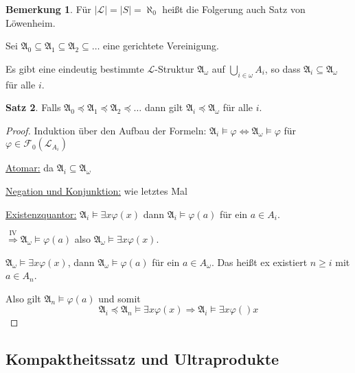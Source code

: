 \documentclass[12pt,parskip=full]{scrartcl}
\newcommand{\abs}[1]{{\left| #1 \right|}}
\newcommand{\heading}{\underline}
\theoremstyle{definition}
\newtheorem{theorem}{Satz}[section]
\newtheorem{remark}[theorem]{Bemerkung}
\begin{document}
	\begin{remark}
		Für $\abs{\mathcal{L}} = \abs{S} = \aleph_0$ heißt die Folgerung auch Satz von Löwenheim.
	\end{remark}

	Sei $\mathfrak{A}_0 \subseteq \mathfrak{A}_1 \subseteq \mathfrak{A}_2 \subseteq \dots$ eine gerichtete Vereinigung.
	
	Es gibt eine eindeutig bestimmte $\mathcal{L}$-Struktur $\mathfrak{A}_\omega$ auf $\bigcup_{i \in \omega} A_i$, so dass $\mathfrak{A}_i \subseteq \mathfrak{A}_\omega$ für alle $i$.
	
	\begin{theorem}
		Falls $\mathfrak{A}_0 \preccurlyeq \mathfrak{A}_1 \preccurlyeq \mathfrak{A}_2 \preccurlyeq \dots$ dann gilt $\mathfrak{A}_i \preccurlyeq \mathfrak{A}_\omega$ für alle $i$.
	\end{theorem}

	\begin{proof}
		Induktion über den Aufbau der Formeln: $\mathfrak{A}_i \models \varphi \Leftrightarrow \mathfrak{A}_\omega \models \varphi$ für $\varphi \in \mathcal{F}_0(\mathcal{L}_{A_i})$
		
		\heading{Atomar:} da $\mathfrak{A}_i \subseteq \mathfrak{A}_\omega$
		
		\heading{Negation und Konjunktion:} wie letztes Mal
		
		\heading{Existenzquantor:} $\mathfrak{A}_i \models \exists x \varphi(x)$ dann $\mathfrak{A}_i \models \varphi(a)$ für ein $a \in A_i$.
		
		$\overset{\text{IV}}{\Rightarrow} \mathfrak{A}_\omega \models \varphi(a)$ also $\mathfrak{A}_\omega \models \exists x \varphi(x)$.
		
		$\mathfrak{A}_\omega \models \exists x \varphi(x)$, dann $\mathfrak{A}_\omega \models \varphi(a)$ für ein $a \in A_\omega$. Das heißt ex existiert $n \geq i$ mit $a \in A_n$.
		
		Also gilt $\mathfrak{A}_n \models \varphi(a)$ und somit
		\begin{equation*}
			\mathfrak{A}_i \preccurlyeq \mathfrak{A}_n \models \exists x \varphi(x) \Rightarrow \mathfrak{A}_i \models \exists x \varphi()x
		\end{equation*}
	\end{proof}

	\subsection{Kompaktheitssatz und Ultraprodukte}
	
\end{document}

